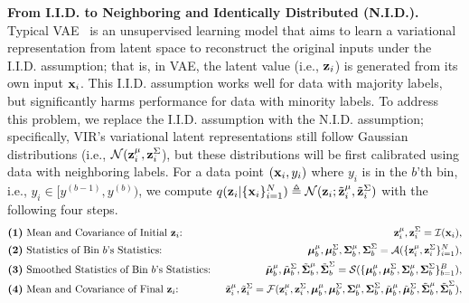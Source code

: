 \textbf{From I.I.D. to Neighboring and Identically Distributed (N.I.D.).}
Typical VAE~\citep{VAE} is an unsupervised learning model that aims to learn a variational representation from latent space to reconstruct the original inputs under the I.I.D. assumption; that is, in VAE, the latent value (i.e., ${\bf z}_i$) is generated from its own input ${\bf x}_i$. 
This I.I.D. assumption works well for data with majority labels, but significantly harms performance for data with minority labels. 
{To address this problem, we replace the I.I.D. assumption with the N.I.D. assumption; specifically, VIR's variational latent representations still follow Gaussian distributions (i.e., $\mathcal{N} ({\bf z}_i^{\mu}, {\bf z}_i^{\Sigma}$), but these distributions will be first calibrated using data with neighboring labels. For a data point $({\bf x}_i,y_i)$ where $y_i$ is in the $b$'th bin, i.e., $y_i\in[y^{(b-1)}, y^{(b)})$, we compute $q({\bf z}_i|\{{\bf x}_i\}_{i=1}^N)\triangleq{\mathcal N}({\bf z}_i; \Tilde{{\bf z}}_i^{\mu}, \Tilde{{\bf z}}_i^{\Sigma})$ with the following four steps.} %
%
\begingroup\makeatletter\def\f@size{9.2}\check@mathfonts
\def\maketag@@@#1{\hbox{\m@th\normalsize\normalfont#1}}%
\begin{align}
&\mbox{\textbf{(1)} Mean and Covariance of Initial $\z_i$: } &\z_i^{\mu}, \z_i^{\Sigma} = \mathcal{I} (\x_i), \nonumber\\
%
&\mbox{\textbf{(2)} Statistics of Bin $b$'s Statistics: } &\muu_b^{\mu}, \muu_b^{\Sigma},\Si_b^{\mu}, \Si_b^{\Sigma} = \mathcal{A} (\{\z_i^{\mu},\z_i^{\Sigma}\}_{i=1}^N), \nonumber\\
%
&\mbox{\textbf{(3)} Smoothed Statistics of Bin $b$'s Statistics: }&\Tilde{\muu}_b^{\mu}, \Tilde{\muu}_b^{\Sigma},\Tilde{\Si}_b^{\mu}, \Tilde{\Si}_b^{\Sigma} = \mathcal{S} (\{\muu_b^{\mu}, \muu_b^{\Sigma},\Si_b^{\mu}, \Si_b^{\Sigma} \}_{b=1}^B), \nonumber\\
%
&\mbox{\textbf{(4)} Mean and Covariance of Final $\z_i$: } &\Tilde{\z}_i^{\mu}, \Tilde{\z}_i^{\Sigma} = \mathcal{F} (\z_i^{\mu}, \z_i^{\Sigma}, \muu_b^{\mu}, \muu_b^{\Sigma},\Si_b^{\mu}, \Si_b^{\Sigma},\Tilde{\muu}_b^{\mu}, \Tilde{\muu}_b^{\Sigma},\Tilde{\Si}_b^{\mu}, \Tilde{\Si}_b^{\Sigma}), \nonumber
\end{align}

